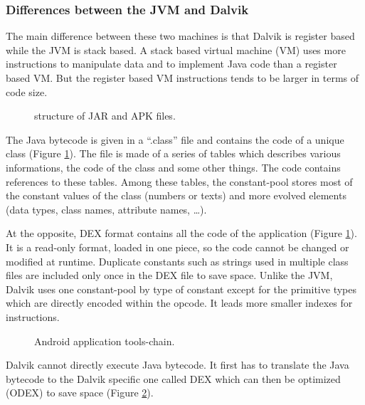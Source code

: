 \documentclass{sig-alternate}
\def \DALVIK{Dalvik\xspace}
\def \ANDROID{Android\xspace}
\def \JVM{JVM\xspace}
\def \DEX{DEX\xspace}
\begin{document}
    \subsubsection{Differences between the JVM and \DALVIK}

      The main difference between these two machines is that \DALVIK is register based while the \JVM is stack based.
      A stack based virtual machine (VM) uses more instructions to manipulate data and to implement Java code than a register based VM.
      But the register based VM instructions tends to be larger in terms of code size\cite{ieee-paul-kundu-energy-perspective}.

      \begin{figure}[!h]
        \centering \resizebox{\linewidth}{!}{}
        \caption{structure of JAR and APK files.}\vspace{-1em}
        \label{SJA}
      \end{figure}

      The Java bytecode is given in a ``.class'' file and contains the code of a unique class (Figure \ref{SJA}).
      The file is made of a series of tables which describes various informations, the code of the class and some other things.
      The code contains references to these tables.
      Among these tables, the constant-pool stores most of the constant values of the class (numbers or texts)
      and more evolved elements (data types, class names, attribute names, \dots).

      At the opposite, \DEX format contains all the code of the application (Figure \ref{SJA}).
      It is a read-only format, loaded in one piece, so the code cannot be changed or modified at runtime.
      Duplicate constants such as strings used in multiple class files
      are included only once in the \DEX file to save space.
      Unlike the \JVM, \DALVIK uses one constant-pool by type of constant
      except for the primitive types which are directly encoded within the opcode.
      It leads more smaller indexes for instructions.\\

      \begin{figure}[!h]
        \centering \resizebox{\linewidth}{!}{}
        \caption{\ANDROID application tools-chain.}
        \label{DTC}
      \end{figure}

      \DALVIK cannot directly execute Java bytecode.
      It first has to translate the Java bytecode to the \DALVIK specific one called \DEX
      which can then be optimized (\mbox{ODEX}) to save space (Figure \ref{DTC}).
\end{document}
